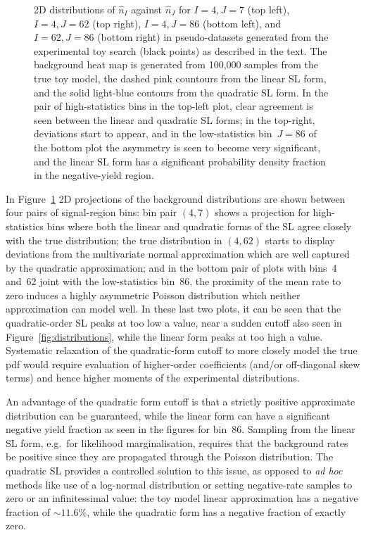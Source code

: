 \documentclass[11pt]{article}
\begin{document}
\begin{figure}
  \caption{2D distributions of $\hat{n}_{I}$ against $\hat{n}_{J}$ for
    $I=4,J=7$ (top left), $I=4,J=62$ (top right), $I=4,J=86$ (bottom left), and
    $I=62,J=86$ (bottom right) in pseudo-datasets generated from the
    experimental toy search (black points) as described in the text. The
    background heat map is generated from 100,000 samples from the true toy
    model, the dashed pink countours from the linear SL form, and the solid
    light-blue contours from the quadratic SL form. In the pair of
    high-statistics bins in the top-left plot, clear agreement is seen between
    the linear and quadratic SL forms; in the top-right, deviations start to
    appear, and in the low-statistics bin~$J=86$ of the bottom plot the
    asymmetry is seen to become very significant, and the linear SL form has a
    significant probability density fraction in the negative-yield region.}
  \label{fig:distributions2d}
\end{figure}

In Figure~\ref{fig:distributions2d} 2D projections of the background
distributions are shown between four pairs of signal-region bins: bin pair
$(4,7)$ shows a projection for high-statistics bins where both the linear and
quadratic forms of the SL agree closely with the true distribution; the true
distribution in $(4,62)$ starts to display deviations from the multivariate
normal approximation which are well captured by the quadratic approximation; and
in the bottom pair of plots with bins~4 and~62 joint with the low-statistics
bin~86, the proximity of the mean rate to zero induces a highly asymmetric
Poisson distribution which neither approximation can model well. In these last
two plots, it can be seen that the quadratic-order SL peaks at too low a value,
near a sudden cutoff also seen in Figure~\ref{fig:distributions}, while the
linear form peaks at too high a value.  Systematic relaxation of the
quadratic-form cutoff to more closely model the true pdf would require
evaluation of higher-order coefficients (and/or off-diagonal skew terms) and
hence higher moments of the experimental distributions.

An advantage of the quadratic form cutoff is that a strictly positive
approximate distribution can be guaranteed, while the linear form can have a
significant negative yield fraction as seen in the figures for bin~86. Sampling
from the linear SL form, e.g.~for likelihood marginalisation, requires that the
background rates be positive since they are propagated through the Poisson
distribution. The quadratic SL provides a controlled solution to this issue,
as opposed to \emph{ad hoc} methods like use of a log-normal distribution or
setting negative-rate samples to zero or an infinitessimal value: the toy model
linear approximation has a negative fraction of $\sim\!11.6\%$, while the
quadratic form has a negative fraction of exactly zero.
\end{document}

